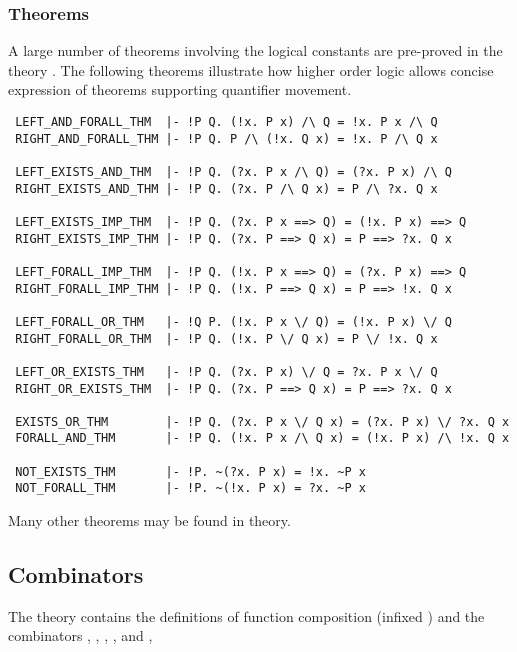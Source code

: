 \subsubsection{Theorems}

A large number of theorems involving the logical constants are
pre-proved in the theory . The following theorems
illustrate how higher order logic allows concise expression of
theorems supporting quantifier movement.

\begin{boxed}
\begin{verbatim}
 LEFT_AND_FORALL_THM  |- !P Q. (!x. P x) /\ Q = !x. P x /\ Q
 RIGHT_AND_FORALL_THM |- !P Q. P /\ (!x. Q x) = !x. P /\ Q x

 LEFT_EXISTS_AND_THM  |- !P Q. (?x. P x /\ Q) = (?x. P x) /\ Q
 RIGHT_EXISTS_AND_THM |- !P Q. (?x. P /\ Q x) = P /\ ?x. Q x

 LEFT_EXISTS_IMP_THM  |- !P Q. (?x. P x ==> Q) = (!x. P x) ==> Q
 RIGHT_EXISTS_IMP_THM |- !P Q. (?x. P ==> Q x) = P ==> ?x. Q x

 LEFT_FORALL_IMP_THM  |- !P Q. (!x. P x ==> Q) = (?x. P x) ==> Q
 RIGHT_FORALL_IMP_THM |- !P Q. (!x. P ==> Q x) = P ==> !x. Q x

 LEFT_FORALL_OR_THM   |- !Q P. (!x. P x \/ Q) = (!x. P x) \/ Q
 RIGHT_FORALL_OR_THM  |- !P Q. (!x. P \/ Q x) = P \/ !x. Q x

 LEFT_OR_EXISTS_THM   |- !P Q. (?x. P x) \/ Q = ?x. P x \/ Q
 RIGHT_OR_EXISTS_THM  |- !P Q. (?x. P ==> Q x) = P ==> ?x. Q x

 EXISTS_OR_THM        |- !P Q. (?x. P x \/ Q x) = (?x. P x) \/ ?x. Q x
 FORALL_AND_THM       |- !P Q. (!x. P x /\ Q x) = (!x. P x) /\ !x. Q x

 NOT_EXISTS_THM       |- !P. ~(?x. P x) = !x. ~P x
 NOT_FORALL_THM       |- !P. ~(!x. P x) = ?x. ~P x
\end{verbatim}
\end{boxed}

\noindent Many other theorems may be found in  theory.

\subsection{Combinators}


The theory 
contains the definitions of function composition (infixed )
and the combinators
,
\ml{K},
\ml{I},
\ml{W},
and \ml{C},

